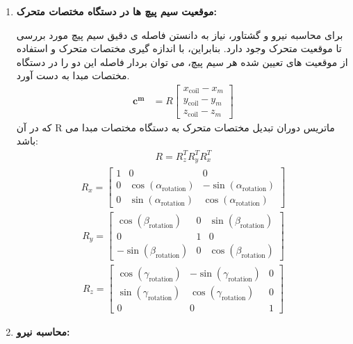 \begin{enumerate}
	\item\textbf{ موقعیت سیم پیچ ها در دستگاه مختصات متحرک:}
	
	برای محاسبه نیرو و گشتاور، نیاز به دانستن فاصله ی دقیق سیم پیچ مورد بررسی تا موقعیت متحرک وجود دارد. بنابراین، با اندازه گیری مختصات متحرک و استفاده از موقعیت های تعیین شده هر سیم پیچ، می توان بردار فاصله این دو را در دستگاه مختصات مبدا به دست آورد.
	\begin{align}
		\mathbf{c^{m}} &= R 
		\begin{bmatrix}
			x_{\text{coil}} - x_m \\
			y_{\text{coil}} - y_m \\
			z_{\text{coil}} - z_m
		\end{bmatrix}
		\label{eq:method-cm-vector}
	\end{align}
	که در آن R ماتریس دوران تبدیل مختصات متحرک به دستگاه مختصات مبدا می باشد:
	\begin{align}
		R = R_z^T R_y^T R_x^T
		\label{eq:method-rotation-matrix-order}
	\end{align}
	\begin{align}
		R_x =
		\begin{bmatrix}
			1 & 0 & 0 \\
			0 & \cos(\alpha_{\text{rotation}}) & -\sin(\alpha_{\text{rotation}}) \\
			0 & \sin(\alpha_{\text{rotation}}) & \cos(\alpha_{\text{rotation}})
		\end{bmatrix}
		\label{eq:method-Rx}
	\end{align}
	\begin{align}
		R_y =
		\begin{bmatrix}
			\cos(\beta_{\text{rotation}}) & 0 & \sin(\beta_{\text{rotation}}) \\
			0 & 1 & 0 \\
			-\sin(\beta_{\text{rotation}}) & 0 & \cos(\beta_{\text{rotation}})
		\end{bmatrix}
		\label{eq:method-Ry}
	\end{align}
	\begin{align}
		R_z =
		\begin{bmatrix}
			\cos(\gamma_{\text{rotation}}) & -\sin(\gamma_{\text{rotation}}) & 0 \\
			\sin(\gamma_{\text{rotation}}) & \cos(\gamma_{\text{rotation}}) & 0 \\
			0 & 0 & 1
		\end{bmatrix}
		\label{eq:method-Rz}
	\end{align}
	\item \textbf{محاسبه نیرو:}
	

\end{enumerate}
